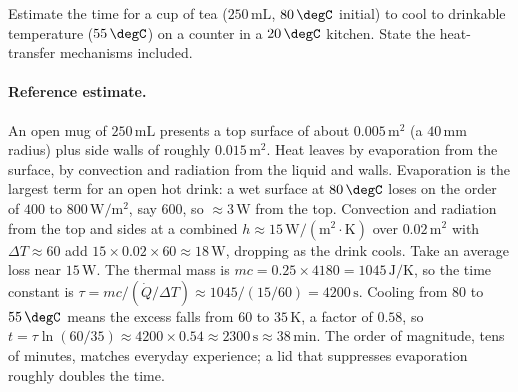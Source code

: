 \begin{exercise}
Estimate the time for a cup of tea ($250\,\text{mL}$, $80\,\degC$
initial) to cool to drinkable temperature ($55\,\degC$) on a counter
in a $20\,\degC$ kitchen. State the heat-transfer mechanisms
included.
\paragraph{Reference estimate.} An open mug of $250\,\text{mL}$ presents
a top surface of about $0.005\,\text{m}^2$ (a $40\,\si{\milli\meter}$
radius) plus side walls of roughly $0.015\,\text{m}^2$. Heat leaves by
evaporation from the surface, by convection and radiation from the
liquid and walls. Evaporation is the largest term for an open hot
drink: a wet surface at $80\,\degC$ loses on the order of $400$ to
$800\,\text{W}/\text{m}^2$, say $600$, so $\approx 3\,\text{W}$ from the
top. Convection and radiation from the top and sides at a combined
$h \approx 15\,\text{W}/(\text{m}^2\cdot\si{\kelvin})$ over $0.02\,
\text{m}^2$ with $\Delta T \approx 60$ add $15 \times 0.02 \times 60
\approx 18\,\text{W}$, dropping as the drink cools. Take an average
loss near $15\,\text{W}$. The thermal mass is $mc = 0.25 \times 4180 =
1045\,\text{J}/\si{\kelvin}$, so the time constant is $\tau = mc/(\dot{Q}
/\Delta T) \approx 1045/(15/60) = 4200\,\text{s}$. Cooling from $80$ to
$55\,\degC$ means the excess falls from $60$ to $35\,\si{\kelvin}$, a
factor of $0.58$, so $t = \tau\ln(60/35) \approx 4200 \times 0.54
\approx 2300\,\text{s} \approx 38\,\text{min}$. The order of magnitude,
tens of minutes, matches everyday experience; a lid that suppresses
evaporation roughly doubles the time.
\end{exercise}

